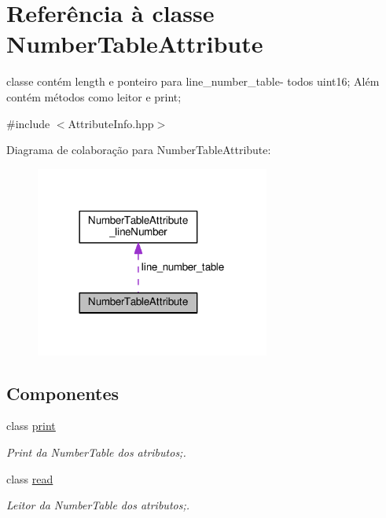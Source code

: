 \hypertarget{class_number_table_attribute}{}\section{Referência à classe Number\+Table\+Attribute}
\label{class_number_table_attribute}


classe contém length e ponteiro para line\+\_\+number\+\_\+table-\/ todos uint16; Além contém métodos como leitor e print;  




{\ttfamily \#include $<$Attribute\+Info.\+hpp$>$}



Diagrama de colaboração para Number\+Table\+Attribute\+:
\nopagebreak
\begin{figure}[H]
\begin{center}
\leavevmode
\includegraphics[width=218pt]{class_number_table_attribute__coll__graph}
\end{center}
\end{figure}
\subsection*{Componentes}
\begin{DoxyCompactItemize}
\item 
class \hyperlink{class_number_table_attribute_1_1print}{print}
\begin{DoxyCompactList}\small\item\em Print da Number\+Table dos atributos;. \end{DoxyCompactList}\item 
class \hyperlink{class_number_table_attribute_1_1read}{read}
\begin{DoxyCompactList}\small\item\em Leitor da Number\+Table dos atributos;. \end{DoxyCompactList}\end{DoxyCompactItemize}
